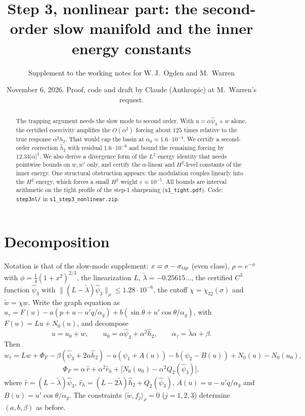 \documentclass[11pt]{amsart}
\title[Step 3: second-order slow manifold, inner constants]{Step 3, nonlinear part: the second-order slow manifold and the inner energy constants}
\author{Supplement to the working notes for W.\,J.~Ogden and M.~Warren}
\date{November 6, 2026. Proof, code and draft by Claude (Anthropic) at M.~Warren's request.}
\theoremstyle{remark}
\newcommand{\eps}{\varepsilon}
\newcommand{\ip}[2]{\langle #1,#2\rangle}
\newcommand{\lt}{\tilde\lambda}
\begin{document}
\begin{abstract}
The trapping argument needs the slow mode to second order. With $u=\alpha\hat\psi_3+w$ alone, the certified coercivity amplifies the $O(\alpha^2)$ forcing about $125$ times relative to the true response $\alpha^2h_2$. That would cap the basin at $\alpha_0\approx1.6\cdot10^{-4}$. We certify a second-order correction $\hat h_2$ with residual $1.6\cdot10^{-6}$ and bound the remaining forcing by $12.34|\alpha|^3$. We also derive a divergence form of the $L^2$ energy identity that needs pointwise bounds on $w,w'$ only, and certify the $\alpha$-linear and $H^2$-level constants of the inner energy. One structural obstruction appears: the modulation couples linearly into the $H^2$ energy, which forces a small $H^2$ weight $\eps\approx10^{-5}$. All bounds are interval arithmetic on the tight profile of the step-1 sharpening (\texttt{s1\_tight.pdf}). Code: \texttt{step3nl/} in \texttt{s1\_step3\_nonlinear.zip}.
\end{abstract}
\maketitle

\section{Decomposition}
Notation is that of the slow-mode supplement: $x=\sigma-\sigma_{\rm tip}$ (even class), $\rho=e^{-\phi}$ with $\phi=\frac14(1+x^2)^{2/3}$, the linearization $L$, $\lt=-0.25615\ldots$, the certified $C^3$ function $\hat\psi_3$ with $\|(L-\lt)\hat\psi_3\|_\rho\le1.28\cdot10^{-6}$, the cutoff $\chi=\chi_{32}(\sigma)$ and $\tilde w=\chi w$. Write the graph equation as $u_\tau=F(u)-a(p+u-u'q/\alpha_g)+b(\sin\theta+u'\cos\theta/\alpha_g)$, with $F(u)=Lu+N_0(u)$, and decompose
\[
u=u_0+w,\qquad u_0=\alpha\hat\psi_3+\alpha^2\hat h_2,\qquad \alpha_\tau=\lt\alpha+\beta .
\]
Then
\[
w_\tau=Lw+\Phi_F-\beta(\hat\psi_3+2\alpha\hat h_2)-a(\psi_1+A(u))-b(\psi_2-B(u))+N_0(u)-N_0(u_0),
\]
\[
\Phi_F=\alpha\,\hat r+\alpha^2\hat r_h+\big[N_0(u_0)-\alpha^2Q_2(\hat\psi_3)\big],
\]
where $\hat r=(L-\lt)\hat\psi_3$, $\hat r_h=(L-2\lt)\hat h_2+Q_2(\hat\psi_3)$, $A(u)=u-u'q/\alpha_g$ and $B(u)=u'\cos\theta/\alpha_g$. The constraints $\ip{\tilde w}{f_j}_\rho=0$ ($j=1,2,3$) determine $(a,b,\beta)$ as before.
\end{document}
